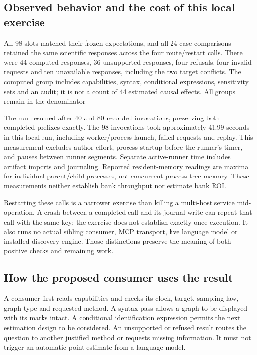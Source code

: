 \subsection{Observed behavior and the cost of this local exercise}

All 98 slots matched their frozen expectations, and all 24 case comparisons
retained the same scientific responses across the four route/restart calls.
There were 44 computed responses, 36 unsupported responses, four refusals,
four invalid requests and ten unavailable responses, including the two target
conflicts. The computed group includes capabilities, syntax, conditional
expressions, sensitivity sets and an audit; it is not a count of 44 estimated
causal effects. All groups remain in the denominator.

The run resumed after 40 and 80 recorded invocations, preserving both completed
prefixes exactly. The 98 invocations took approximately 41.99 seconds in this
local run, including worker/process launch, failed requests and replay. This
measurement excludes author effort, process startup before the runner's timer,
and pauses between runner segments. Separate active-runner time includes
artifact imports and journaling. Reported resident-memory readings are maxima
for individual parent/child processes, not concurrent process-tree memory.
These measurements neither establish bank throughput nor estimate bank ROI.

Restarting these calls is a narrower exercise than killing a multi-host
service mid-operation. A crash between a completed call and its journal write
can repeat that call with the same key; the exercise does not establish
exactly-once execution. It also runs no actual sibling consumer, MCP transport,
live language model or installed discovery engine. Those distinctions preserve
the meaning of both positive checks and remaining work.

\subsection{How the proposed consumer uses the result}

A consumer first reads capabilities and checks its clock, target, sampling law,
graph type and requested method. A syntax pass allows a graph to be displayed
with its marks intact. A conditional identification expression permits the
next estimation design to be considered. An unsupported or refused result
routes the question to another justified method or requests missing information.
It must not trigger an automatic point estimate from a language model.

